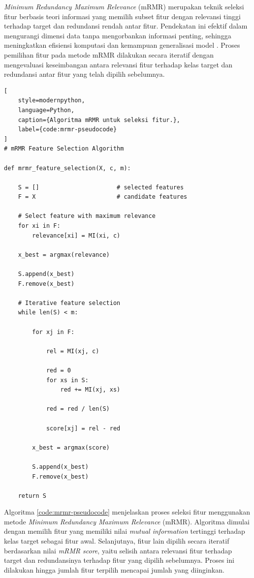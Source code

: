 \textit{Minimum Redundancy Maximum Relevance} (mRMR) merupakan teknik seleksi fitur berbasis teori informasi yang memilih subset fitur dengan relevansi tinggi terhadap target dan redundansi rendah antar fitur.  Pendekatan ini efektif dalam mengurangi dimensi data tanpa mengorbankan informasi penting, sehingga meningkatkan efisiensi komputasi dan kemampuan generalisasi model \cite{sleep_apnea_eeg}\cite{tsmrmr_sleep}. Proses pemilihan fitur pada metode mRMR dilakukan secara iteratif dengan mengevaluasi keseimbangan antara relevansi fitur terhadap kelas target dan redundansi antar fitur yang telah dipilih sebelumnya. 

\begin{lstlisting}[
    style=modernpython,
    language=Python,
    caption={Algoritma mRMR untuk seleksi fitur.},
    label={code:mrmr-pseudocode}
]
# mRMR Feature Selection Algorithm

def mrmr_feature_selection(X, c, m):

    S = []                      # selected features
    F = X                       # candidate features

    # Select feature with maximum relevance
    for xi in F:
        relevance[xi] = MI(xi, c)

    x_best = argmax(relevance)

    S.append(x_best)
    F.remove(x_best)

    # Iterative feature selection
    while len(S) < m:

        for xj in F:

            rel = MI(xj, c)

            red = 0
            for xs in S:
                red += MI(xj, xs)

            red = red / len(S)

            score[xj] = rel - red

        x_best = argmax(score)

        S.append(x_best)
        F.remove(x_best)

    return S
\end{lstlisting}

Algoritma \ref{code:mrmr-pseudocode} menjelaskan proses seleksi fitur menggunakan metode \textit{Minimum Redundancy Maximum Relevance} (mRMR). Algoritma dimulai dengan memilih fitur yang memiliki nilai \textit{mutual information} tertinggi terhadap kelas target sebagai fitur awal. Selanjutnya, fitur lain dipilih secara iteratif berdasarkan nilai \textit{mRMR score}, yaitu selisih antara relevansi fitur terhadap target dan redundansinya terhadap fitur yang dipilih sebelumnya. Proses ini dilakukan hingga jumlah fitur terpilih mencapai jumlah yang diinginkan.

